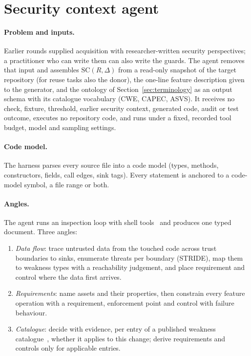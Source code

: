 \section{Security context agent}
\label{sec:agent}

\paragraph{Problem and inputs.}
Earlier rounds supplied acquisition with researcher-written security
perspectives; a practitioner who can write them can also write the guards.
The agent removes that input and assembles $\mathrm{SC}(R,\Delta)$ from a
read-only snapshot of the target repository (for reuse tasks also the donor),
the one-line feature description given to the generator, and the ontology of
Section~\ref{sec:terminology} as an output schema with its catalogue
vocabulary (CWE, CAPEC, ASVS). It receives no check, fixture, threshold,
earlier security context, generated code, audit or test outcome, executes no
repository code, and runs under a fixed, recorded tool budget, model and
sampling settings.

\paragraph{Code model.}
The harness parses every source file into a code model (types, methods,
constructors, fields, call edges, sink tags). Every statement is anchored to
a code-model symbol, a file range or both.

\paragraph{Angles.}
The agent runs an inspection loop with shell tools~\citep{yang2024} and
produces one typed document. Three angles:
\begin{enumerate}\setlength\itemsep{0pt}
\item \emph{Data flow}: trace untrusted data from the touched code across
  trust boundaries to sinks, enumerate threats per boundary (STRIDE), map
  them to weakness types with a reachability judgement, and place requirement
  and control where the data first arrives.
\item \emph{Requirements}: name assets and their properties, then constrain
  every feature operation with a requirement, enforcement point and control
  with failure behaviour.
\item \emph{Catalogue}: decide with evidence, per entry of a published
  weakness catalogue~\citep{cwetop25}, whether it applies to this change;
  derive requirements and controls only for applicable entries.
\end{enumerate}

